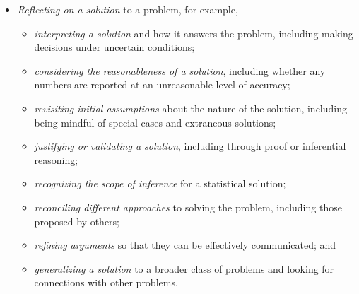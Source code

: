 \documentclass[
  10pt,
  a4paper,
  landscape,
  twoside,
  openany
]{scrbook}
\newcounter{example}
\begin{document}
{{\begin{itemize}
  \item \emph{Reflecting on a solution} to a problem, for example,
  \begin{itemize}
    \item \emph{interpreting a solution} and how it answers the problem, including making decisions under uncertain conditions;
    \item \emph{considering the reasonableness of a solution}, including whether any numbers are reported at an unreasonable level of accuracy;
    \item \emph{revisiting initial assumptions} about the nature of the solution, including being mindful of special cases and extraneous solutions;
    \item \emph{justifying or validating a solution}, including through proof or inferential reasoning;
    \item \emph{recognizing the scope of inference} for a statistical solution;
    \item \emph{reconciling different approaches} to solving the problem, including those proposed by others;
    \item \emph{refining arguments} so that they can be effectively communicated; and
    \item \emph{generalizing a solution} to a broader class of problems and looking for connections with other problems.
  \end{itemize}
\end{itemize}
}
}
\end{document}
